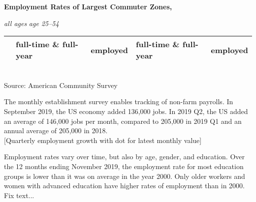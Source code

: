 \documentclass{report}
\begin{document}
{{{{\begin{minipage}{0.76\textwidth}
\noindent \normalsize \textbf{Employment Rates of Largest Commuter Zones, }\\ 
\vspace{-2mm}

\noindent \footnotesize \hspace{42mm} \textit{all ages} \hspace{20mm} \textit{age 25--54}\\
\vspace{-2mm}
 
 \setlength{\tabcolsep}{3.1pt} \color{black!90}
		{\renewcommand{\arraystretch}{1.55}
		 \begin{tabular}{p{24mm} R{15mm} R{15mm} R{15mm} R{15mm}}
		 	& full-time \& full-year & employed & full-time \& full-year & employed \\
			 \hline
		\end{tabular}
		}	\\

\footnotesize{Source: American Community Survey}\\

\vspace{8mm}

\end{minipage}

\newpage

\begin{minipage}{0.76\textwidth} 

\small The monthly establishment survey enables tracking of non-farm payrolls. In September 2019, the US economy added 136,000 jobs. In 2019 Q2, the US added an average of 146,000 jobs per month, compared to 205,000 in 2019 Q1 and an annual average of 205,000 in 2018. \\

\normalsize [Quarterly employment growth with dot for latest monthly value] 

\end{minipage}

\newpage

\begin{minipage}{0.76\textwidth} 

\small Employment rates vary over time, but also by age, gender, and education. Over the 12 months ending November 2019, the employment rate for most education groups is lower than it was on average in the year 2000. Only older workers and women with advanced education have higher rates of employment than in 2000. Fix text... \\


\end{minipage}}}}}
\end{document}
